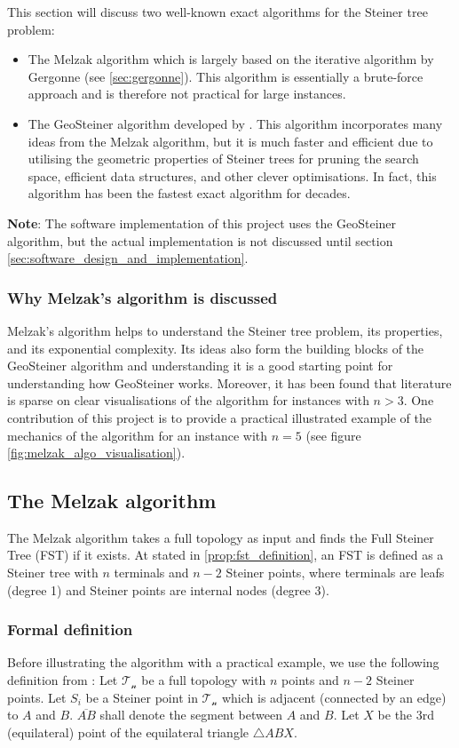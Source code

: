 \documentclass{l4proj}
\begin{document}
This section will discuss two well-known exact algorithms for the Steiner tree problem:
\begin{itemize}
    \item The Melzak algorithm \cite{MelzakAlgo} which is largely based on the iterative algorithm by Gergonne \citep{Brazil2014} (see \ref{sec:gergonne}). This algorithm is essentially a brute-force approach and is therefore not practical for large instances.
    \item The GeoSteiner algorithm developed by \cite{geosteiner96}. This algorithm incorporates many ideas from the Melzak algorithm, but it is much faster and efficient due to utilising the geometric properties of Steiner trees for pruning the search space, efficient data structures, and other clever optimisations. In fact, this algorithm has been the fastest exact algorithm for decades.
\end{itemize}
\textbf{Note}: The software implementation of this project uses the GeoSteiner algorithm, but the actual implementation is not discussed until section \ref{sec:software_design_and_implementation}.

\subsubsection{Why Melzak's algorithm is discussed}
Melzak's algorithm helps to understand the Steiner tree problem, its properties, and its exponential complexity. Its ideas also form the building blocks of the GeoSteiner algorithm and understanding it is a good starting point for understanding how GeoSteiner works. Moreover, it has been found that literature is sparse on clear visualisations of the algorithm for instances with $n>3$. One contribution of this project is to provide a practical illustrated example of the mechanics of the algorithm for an instance with $n=5$ (see figure \ref{fig:melzak_algo_visualisation}).

\subsection{The Melzak algorithm}
\label{sec:melzak_algo}
The Melzak algorithm takes a full topology as input and finds the Full Steiner Tree (FST) if it exists. At stated in \ref{prop:fst_definition}, an FST is defined as a Steiner tree with $n$ terminals and $n-2$ Steiner points, where terminals are leafs (degree 1) and Steiner points are internal nodes (degree 3).

\subsubsection{Formal definition}
Before illustrating the algorithm with a practical example, we use the following definition from \citep{Brazil2015}:
Let $\mathcal{T_n}$ be a full topology with $n$ points and $n - 2$ Steiner points. Let $S_i$ be a Steiner point in $\mathcal{T_n}$ which is adjacent (connected by an edge) to $A$ and $B$. $\overline{AB}$ shall denote the segment between $A$ and $B$. Let $X$ be the 3rd (equilateral) point of the equilateral triangle $\triangle ABX$.
\end{document}

